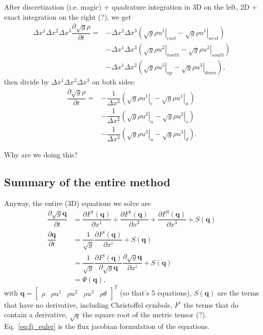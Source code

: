 \documentclass[12pt]{article}
\begin{document}
After discretization (i.e. magic) + quadrature integration in 3D on the left, 2D + exact integration on the right (?), we get
\begin{align}
    \Delta x^1 \Delta x^2 \Delta x^3 \dfrac{\partial\sqrt{g}\rho}{\partial t} =
      & -\Delta x^2 \Delta x^3 \left( \left. \sqrt{g}\rho u^1 \right|_{east} - \left. \sqrt{g}\rho u^1 \right|_{west} \right) \\
      & -\Delta x^1 \Delta x^3 \left( \left. \sqrt{g}\rho u^2 \right|_{north} - \left. \sqrt{g}\rho u^2 \right|_{south} \right) \\
      & -\Delta x^1 \Delta x^2 \left( \left. \sqrt{g}\rho u^3 \right|_{up} - \left. \sqrt{g}\rho u^3 \right|_{down} \right)
      \text{,}
\end{align}
then divide by $\Delta x^1 \Delta x^2 \Delta x^3$ on both sides:
\begin{align}
    \dfrac{\partial\sqrt{g}\rho}{\partial t} =
      & -\dfrac{1}{\Delta x^3} \left( \left. \sqrt{g}\rho u^1 \right|_{e} - \left. \sqrt{g}\rho u^1 \right|_{w} \right) \\
      & -\dfrac{1}{\Delta x^2} \left( \left. \sqrt{g}\rho u^2 \right|_{n} - \left. \sqrt{g}\rho u^2 \right|_{s} \right) \\
      & -\dfrac{1}{\Delta x^3} \left( \left. \sqrt{g}\rho u^3 \right|_{u} - \left. \sqrt{g}\rho u^3 \right|_{d} \right)
      \text{.}
\end{align}

Why are we doing this?


\subsection{Summary of the entire method}

Anyway, the entire (3D) equations we solve are
\begin{align}
    \dfrac{\partial\sqrt{g}\bm{q}}{\partial t}
        &= \dfrac{\partial F^1(\bm{q})}{\partial x^1} + \dfrac{\partial F^1(\bm{q})}{\partial x^3} +
           \dfrac{\partial F^3(\bm{q})}{\partial x^3} + S(\bm{q})\\
    \dfrac{\partial\bm{q}}{\partial t}
        &= \dfrac{1}{\sqrt{g}}
           \dfrac{\partial F^i(\bm{q})}{\partial x^i} + S(\bm{q}) \label{eq:basic_euler}\\
    &= \dfrac{1}{\sqrt{g}}\dfrac{\partial F^i(\bm{q})}{\partial\sqrt{g}\bm{q}} \dfrac{\partial\sqrt{g}\bm{q}}{\partial x^i} + S(\bm{q})   \label{eq:fj_euler}\\
    &= \Psi(\bm{q})
    \text{,}
\end{align}
with $\bm{q} = \left[\begin{matrix} \rho & \rho u^1 & \rho u^2 & \rho u^3 & \rho\theta \end{matrix}\right]^T$
(so that's 5 equations),
$S(\bm{q})$ are the terms that have no derivative, including Christoffel symbols,
 $F^i$ the terms that do contain a derivative, $\sqrt{q}$ the square root of the metric tensor (?).
 Eq.~\ref{eq:fj_euler} is the flux jacobian formulation of the equations.
\end{document}

